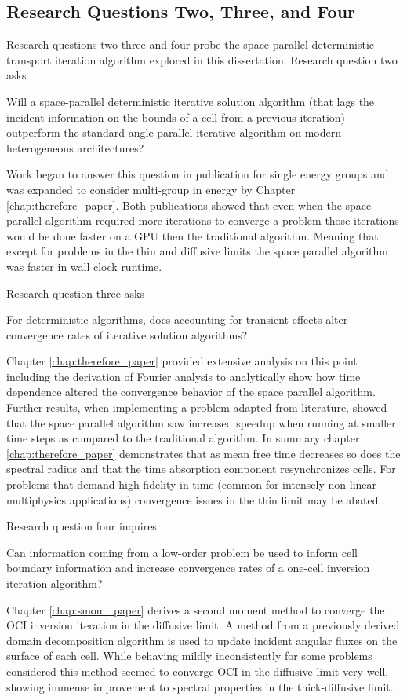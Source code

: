 \subsection{Research Questions Two, Three, and Four}

Research questions two three and four probe the space-parallel deterministic transport iteration algorithm explored in this dissertation.
Research question two asks
\begin{displayquote}
Will a space-parallel deterministic iterative solution algorithm (that lags the incident information on the bounds of a cell from a previous iteration) outperform the standard angle-parallel iterative algorithm on modern heterogeneous architectures?
\end{displayquote}
Work began to answer this question in publication \cite{morgan2023oci} for single energy groups and was expanded to consider multi-group in energy by Chapter \ref{chap:therefore_paper}.
Both publications showed that even when the space-parallel algorithm required more iterations to converge a problem those iterations would be done faster on a GPU then the traditional algorithm.
Meaning that except for problems in the thin and diffusive limits the space parallel algorithm was faster in wall clock runtime.

Research question three asks
\begin{displayquote}
For deterministic algorithms, does accounting for transient effects alter convergence rates of iterative solution algorithms?
\end{displayquote}
Chapter \ref{chap:therefore_paper} provided extensive analysis on this point including the derivation of Fourier analysis to analytically show how time dependence altered the convergence behavior of the space parallel algorithm.
Further results, when implementing a problem adapted from literature, showed that the space parallel algorithm saw increased speedup when running at smaller time steps as compared to the traditional algorithm.
In summary chapter \ref{chap:therefore_paper} demonstrates that as mean free time decreases so does the spectral radius and that the time absorption component resynchronizes cells.
For problems that demand high fidelity in time (common for intensely non-linear multiphysics applications) convergence issues in the thin limit may be abated.

Research question four inquires
\begin{displayquote}
Can information coming from a low-order problem be used to inform cell boundary information and increase convergence rates of a one-cell inversion iteration algorithm?
\end{displayquote}
Chapter \ref{chap:smom_paper} derives a second moment method to converge the OCI inversion iteration in the diffusive limit.
A method from a previously derived domain decomposition algorithm is used to update incident angular fluxes on the surface of each cell.
While behaving mildly inconsistently for some problems considered this method seemed to converge OCI in the diffusive limit very well, showing immense improvement to spectral properties in the thick-diffusive limit.


